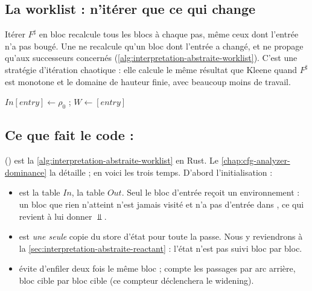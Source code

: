 \subsection{La worklist : n'itérer que ce qui change}

Itérer $F^\sharp$ en bloc recalcule tous les blocs à chaque pas, même ceux
dont l'entrée n'a pas bougé. Une  ne recalcule qu'un bloc dont
l'entrée a changé, et ne propage qu'aux successeurs concernés
(\cref{alg:interpretation-abstraite-worklist}). C'est une stratégie
d'itération chaotique : elle calcule le même résultat que Kleene quand $F^\sharp$
est monotone et le domaine de hauteur finie, avec beaucoup moins de travail.

\begin{algorithm}[htbp]
$\mathit{In}[\mathit{entry}] \gets \rho_0$ ; $W \gets [\mathit{entry}]$\;
\caption{Worklist d'un CFG, telle que l'implémente }
\label{alg:interpretation-abstraite-worklist}
\end{algorithm}

\subsection{Ce que fait le code : }

 () est la
\cref{alg:interpretation-abstraite-worklist} en Rust. Le
\cref{chap:cfg-analyzer-dominance} la détaille ; en voici les trois temps.
D'abord l'initialisation :


\begin{itemize}
  \item {} est la table $\mathit{In}$,  la table
    $\mathit{Out}$. Seul le bloc d'entrée reçoit un environnement : un bloc que
    rien n'atteint n'est jamais visité et n'a pas d'entrée dans
    , ce qui revient à lui donner $\Bot$.
  \item {} est \emph{une seule} copie du store d'état pour toute
    la passe. Nous y reviendrons à la
    \cref{sec:interpretation-abstraite-reactant} : l'état n'est pas suivi bloc
    par bloc.
  \item {} évite d'enfiler deux fois le même bloc ;
     compte les passages par arc arrière, bloc cible par
    bloc cible (ce compteur déclenchera le widening).
\end{itemize}

